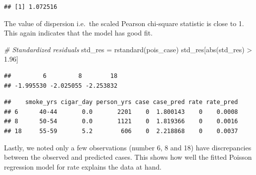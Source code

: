 \documentclass[
  10pt,
]{krantz}
\newenvironment{Shaded}{\begin{snugshade}}{\end{snugshade}}
\newcommand{\AttributeTok}[1]{\textcolor[rgb]{0.77,0.63,0.00}{#1}}
\newcommand{\CommentTok}[1]{\textcolor[rgb]{0.56,0.35,0.01}{\textit{#1}}}
\newcommand{\DecValTok}[1]{\textcolor[rgb]{0.00,0.00,0.81}{#1}}
\newcommand{\FloatTok}[1]{\textcolor[rgb]{0.00,0.00,0.81}{#1}}
\newcommand{\FunctionTok}[1]{\textcolor[rgb]{0.00,0.00,0.00}{#1}}
\newcommand{\NormalTok}[1]{#1}
\newcommand{\OtherTok}[1]{\textcolor[rgb]{0.56,0.35,0.01}{#1}}
\newcommand{\SpecialCharTok}[1]{\textcolor[rgb]{0.00,0.00,0.00}{#1}}
\begin{document}
\begin{verbatim}
## [1] 1.072516
\end{verbatim}

The value of dispersion i.e.~the scaled Pearson chi-square statistic is close to 1. This again indicates that the model has good fit.

\begin{Shaded}
\begin{Highlighting}[]
\CommentTok{\# Standardized residuals}
\NormalTok{std\_res }\OtherTok{=} \FunctionTok{rstandard}\NormalTok{(pois\_case)}
\NormalTok{std\_res[}\FunctionTok{abs}\NormalTok{(std\_res) }\SpecialCharTok{\textgreater{}} \FloatTok{1.96}\NormalTok{]}
\end{Highlighting}
\end{Shaded}

\begin{verbatim}
##         6         8        18 
## -1.995530 -2.025055 -2.253832
\end{verbatim}

\begin{Shaded}
\end{Shaded}

\begin{verbatim}
##    smoke_yrs cigar_day person_yrs case case_pred rate rate_pred
## 6      40-44       0.0       2201    0  1.800143    0    0.0008
## 8      50-54       0.0       1121    0  1.819366    0    0.0016
## 18     55-59       5.2        606    0  2.218868    0    0.0037
\end{verbatim}

Lastly, we noted only a few observations (number 6, 8 and 18) have discrepancies between the observed and predicted cases. This shows how well the fitted Poisson regression model for rate explains the data at hand.
\end{document}

